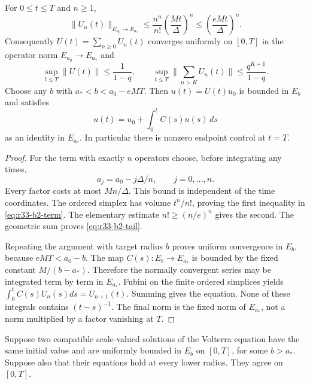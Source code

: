 \begin{theorem}
\label{thm:r33-b2-scale}
For $0\le t\le T$ and $n\ge1$,
\begin{equation}\label{eq:r33-b2-term}
 \|U_n(t)\|_{E_{a_0}\to E_{a_*}}
 \le \frac{n^n}{n!}\left(\frac{Mt}{\Delta}\right)^n
 \le \left(\frac{eMt}{\Delta}\right)^n.
\end{equation}
Consequently $U(t)=\sum_{n\ge0}U_n(t)$ converges uniformly on $[0,T]$ in the operator norm $E_{a_0}\to E_{a_*}$ and
\begin{equation}\label{eq:r33-b2-tail}
 \sup_{t\le T}\|U(t)\|\le\frac1{1-q},\qquad
 \sup_{t\le T}\Big\|\sum_{n>K}U_n(t)\Big\|
 \le\frac{q^{K+1}}{1-q}.
\end{equation}
Choose any $b$ with $a_*<b<a_0-eMT$. Then $u(t)=U(t)u_0$ is bounded in $E_b$ and satisfies
\[
 u(t)=u_0+\int_0^t C(s)u(s)\,ds
\]
as an identity in $E_{a_*}$. In particular there is nonzero endpoint control at $t=T$.
\end{theorem}

\begin{proof}
For the term with exactly $n$ operators choose, before integrating any times,
\[
 a_j=a_0-j\Delta/n,\qquad j=0,\ldots,n.
\]
Every factor costs at most $Mn/\Delta$. This bound is independent of the time coordinates. The ordered simplex has volume $t^n/n!$, proving the first inequality in \eqref{eq:r33-b2-term}. The elementary estimate $n!\ge(n/e)^n$ gives the second. The geometric sum proves \eqref{eq:r33-b2-tail}.

Repeating the argument with target radius $b$ proves uniform convergence in $E_b$, because $eMT<a_0-b$. The map $C(s):E_b\to E_{a_*}$ is bounded by the fixed constant $M/(b-a_*)$. Therefore the normally convergent series may be integrated term by term in $E_{a_*}$. Fubini on the finite ordered simplices yields $\int_0^t C(s)U_n(s)ds=U_{n+1}(t)$. Summing gives the equation. None of these integrals contains $(t-s)^{-1}$. The final norm is the fixed norm of $E_{a_*}$, not a norm multiplied by a factor vanishing at $T$.
\end{proof}

\begin{proposition}
\label{prop:r33-b2-unique}
Suppose two compatible scale-valued solutions of the Volterra equation have the same initial value and are uniformly bounded in $E_b$ on $[0,T]$, for some $b>a_*$. Suppose also that their equations hold at every lower radius. They agree on $[0,T]$.
\end{proposition}

